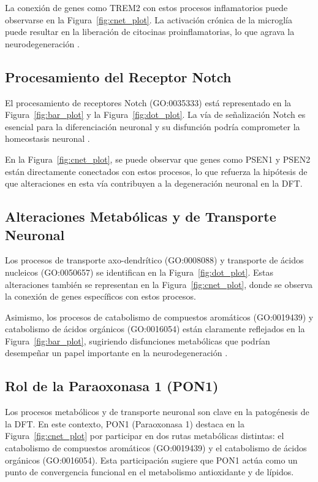 La conexión de genes como TREM2 con estos procesos inflamatorios puede observarse en la Figura~\ref{fig:cnet_plot}. La activación crónica de la microglía puede resultar en la liberación de citocinas proinflamatorias, lo que agrava la neurodegeneración \cite{yeh2016trem2}.

\subsection{Procesamiento del Receptor Notch}

El procesamiento de receptores Notch (GO:0035333) está representado en la Figura~\ref{fig:bar_plot} y la Figura~\ref{fig:dot_plot}. La vía de señalización Notch es esencial para la diferenciación neuronal y su disfunción podría comprometer la homeostasis neuronal \cite{kopan2009canonical}.

En la Figura~\ref{fig:cnet_plot}, se puede observar que genes como PSEN1 y PSEN2 están directamente conectados con estos procesos, lo que refuerza la hipótesis de que alteraciones en esta vía contribuyen a la degeneración neuronal en la DFT.

\subsection{Alteraciones Metabólicas y de Transporte Neuronal}

Los procesos de transporte axo-dendrítico (GO:0008088) y transporte de ácidos nucleicos (GO:0050657) se identifican en la Figura~\ref{fig:dot_plot}. Estas alteraciones también se representan en la Figura~\ref{fig:cnet_plot}, donde se observa la conexión de genes específicos con estos procesos.

Asimismo, los procesos de catabolismo de compuestos aromáticos (GO:0019439) y catabolismo de ácidos orgánicos (GO:0016054) están claramente reflejados en la Figura~\ref{fig:bar_plot}, sugiriendo disfunciones metabólicas que podrían desempeñar un papel importante en la neurodegeneración \cite{seelaar2011clinical}.

\subsection{Rol de la Paraoxonasa 1 (PON1)}

Los procesos metabólicos y de transporte neuronal son clave en la patogénesis de la DFT. En este contexto, PON1 (Paraoxonasa 1) destaca en la Figura~\ref{fig:cnet_plot} por participar en dos rutas metabólicas distintas: el catabolismo de compuestos aromáticos (GO:0019439) y el catabolismo de ácidos orgánicos (GO:0016054). Esta participación sugiere que PON1 actúa como un punto de convergencia funcional en el metabolismo antioxidante y de lípidos.

